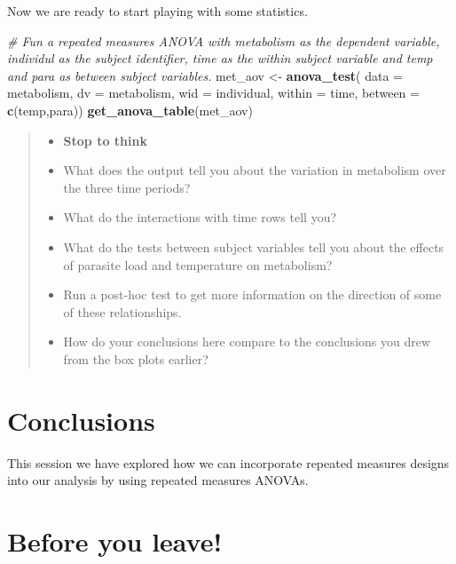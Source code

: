 \documentclass[
]{book}
\newenvironment{Shaded}{\begin{snugshade}}{\end{snugshade}}
\newcommand{\AttributeTok}[1]{\textcolor[rgb]{0.13,0.29,0.53}{#1}}
\newcommand{\CommentTok}[1]{\textcolor[rgb]{0.56,0.35,0.01}{\textit{#1}}}
\newcommand{\FunctionTok}[1]{\textcolor[rgb]{0.13,0.29,0.53}{\textbf{#1}}}
\newcommand{\NormalTok}[1]{#1}
\newcommand{\OtherTok}[1]{\textcolor[rgb]{0.56,0.35,0.01}{#1}}
\providecommand{\tightlist}{%
  \setlength{\itemsep}{0pt}\setlength{\parskip}{0pt}}
\begin{document}
Now we are ready to start playing with some statistics.

\begin{Shaded}
\begin{Highlighting}[]
\CommentTok{\# Fun a repeated measures ANOVA with metabolism as the dependent variable, individul as the subject identifier, time as the within subject variable and temp and para as between subject variables.}
\NormalTok{met\_aov }\OtherTok{\textless{}{-}} \FunctionTok{anova\_test}\NormalTok{(}
  \AttributeTok{data =}\NormalTok{ metabolism, }\AttributeTok{dv =}\NormalTok{ metabolism, }\AttributeTok{wid =}\NormalTok{ individual,}
  \AttributeTok{within =}\NormalTok{  time, }\AttributeTok{between =} \FunctionTok{c}\NormalTok{(temp,para))}
\FunctionTok{get\_anova\_table}\NormalTok{(met\_aov)}
\end{Highlighting}
\end{Shaded}

\begin{quote}
\begin{itemize}
\tightlist
\item
  \textbf{Stop to think}
\item
  What does the output tell you about the variation in metabolism over the three time periods?
\item
  What do the interactions with time rows tell you?
\item
  What do the tests between subject variables tell you about the effects of parasite load and temperature on metabolism?
\item
  Run a post-hoc test to get more information on the direction of some of these relationships.
\item
  How do your conclusions here compare to the conclusions you drew from the box plots earlier?
\end{itemize}
\end{quote}

\section{Conclusions}\label{conclusions-1}

This session we have explored how we can incorporate repeated measures designs into our analysis by using repeated measures ANOVAs.

\section{Before you leave!}\label{before-you-leave-9}
\end{document}
